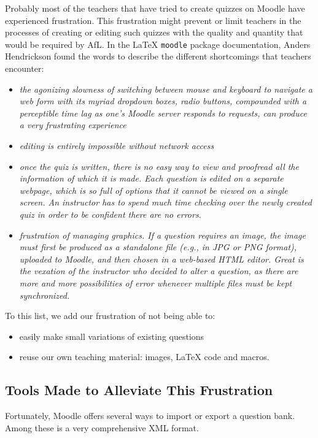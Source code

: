 \documentclass[twocolumn,a4paper,9pt]{article}
\begin{document}
Probably most of the teachers that have tried to create quizzes on Moodle have 
experienced frustration. This frustration might prevent or limit teachers in 
the processes of creating or editing such quizzes with the quality and quantity 
that would be required by AfL. In the \LaTeX{} \texttt{moodle} package 
documentation, Anders Hendrickson found the words to describe the different 
shortcomings that teachers encounter:
\begin{itemize}
\item \emph{the agonizing slowness of switching between mouse and keyboard to 
navigate a web form with its myriad dropdown boxes, radio buttons, compounded 
with a perceptible time lag as one’s Moodle server responds to requests, can 
produce a very frustrating experience}
\item \emph{editing is entirely impossible without network access}
\item \emph{once the quiz is written, there is no easy way to view and 
proofread all the information of which it is made. Each question is edited on a 
separate webpage, which is so full of options that it cannot be viewed on a 
single screen. An instructor has to spend much time checking over the newly 
created quiz in order to be confident there are no errors.}
\item \emph{frustration of managing graphics. If a question requires
an image, the image must first be produced as a standalone file (e.g., in JPG 
or PNG format), uploaded to Moodle, and then chosen in a web-based HTML editor. 
Great is the vexation of the instructor who decided to alter a question, as 
there are more and more possibilities of error whenever multiple files must be 
kept synchronized.}
\end{itemize}

To this list, we add our frustration of not being able to:
\begin{itemize}
	\item easily make small variations of existing questions
	\item reuse our own teaching material: images, \LaTeX{} code and macros.
\end{itemize}

\subsection{Tools Made to Alleviate This Frustration}

Fortunately, Moodle offers several ways to import or export a question bank. 
Among these is a very comprehensive XML format.
\end{document}
